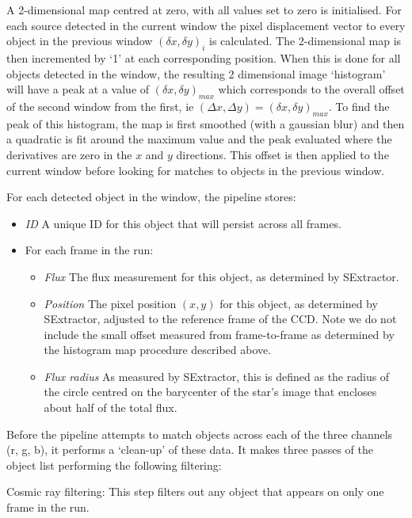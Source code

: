 A 2-dimensional map centred at zero, with all values set to zero is initialised. For each source detected in the current window the pixel displacement vector to every object in the previous window $(\delta x, \delta y)_i$ is calculated.  The 2-dimensional map is then incremented by `1' at each corresponding position. When this is done for all objects detected in the window, the resulting 2 dimensional image `histogram' will have a peak at a value of $(\delta x, \delta y)_{max}$ which corresponds to the overall offset of the second window from the first, ie $(\Delta x, \Delta y) = (\delta x, \delta y)_{max}$. To find the peak of this histogram, the map is first smoothed (with a gaussian blur) and then a quadratic is fit around the maximum value and the peak evaluated where the derivatives are zero in the $x$ and $y$ directions. This offset is then applied to the current window before looking for matches to objects in the previous window.

For each detected object in the window, the pipeline stores: 
\begin{itemize}
  \item \emph{ID} A unique ID for this object that will persist across all frames.
  \item For each frame in the run:
  \begin{itemize}
    \item \emph{Flux} The flux measurement for this object, as determined by SExtractor.
    \item \emph{Position} The pixel position $(x, y)$ for this object, as determined by SExtractor, adjusted to the reference frame of the CCD. Note we do not include the small offset measured from frame-to-frame as determined by the histogram map procedure described above. 
    \item \emph{Flux radius} As measured by SExtractor, this is defined as the radius of the circle centred on the barycenter of the star's image that encloses about half of the total flux. 
  \end{itemize}
\end{itemize}

\label{sect:filtering}
Before the pipeline attempts to match objects across each of the three channels (r, g, b), it performs a `clean-up' of these data. It makes three passes of the object list performing the following filtering:

Cosmic ray filtering: This step filters out any object that appears on only one frame in the run. 

